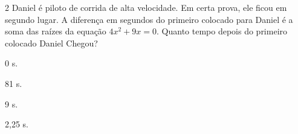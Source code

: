 {{%





\num{2} Daniel é piloto de corrida de alta velocidade. Em certa prova,
ele ficou em segundo lugar. A diferença em segundos do primeiro colocado para
Daniel é a soma das raízes da equação $4x^2 + 9x = 0$. Quanto tempo depois
do primeiro colocado Daniel Chegou?

\begin{escolha}[itemsep=0pt]
\item 0 s.
\item 81 s.
\item 9 s.
\item 2,25 s.
\end{escolha}













}}
